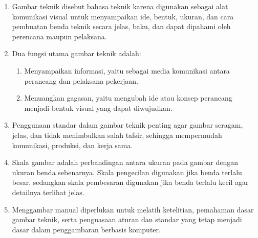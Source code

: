\documentclass[../menggambarteknik.tex]{subfiles}
\begin{document}
\begin{enumerate}

	\item Gambar teknik disebut bahasa teknik karena digunakan sebagai alat komunikasi visual untuk menyampaikan ide, bentuk, ukuran, dan cara pembuatan benda teknik secara jelas, baku, dan dapat dipahami oleh perencana maupun pelaksana.

	\item Dua fungsi utama gambar teknik adalah:
	      \begin{enumerate}
		      \item Menyampaikan informasi, yaitu sebagai media komunikasi antara perancang dan pelaksana pekerjaan.
		      \item Menuangkan gagasan, yaitu mengubah ide atau konsep perancang menjadi bentuk visual yang dapat diwujudkan.
	      \end{enumerate}

	\item Penggunaan standar dalam gambar teknik penting agar gambar seragam, jelas, dan tidak menimbulkan salah tafsir, sehingga mempermudah komunikasi, produksi, dan kerja sama.

	\item Skala gambar adalah perbandingan antara ukuran pada gambar dengan ukuran benda sebenarnya. Skala pengecilan digunakan jika benda terlalu besar, sedangkan skala pembesaran digunakan jika benda terlalu kecil agar detailnya terlihat jelas.

	\item Menggambar manual diperlukan untuk melatih ketelitian, pemahaman dasar gambar teknik, serta penguasaan aturan dan standar yang tetap menjadi dasar dalam penggambaran berbasis komputer.
\end{enumerate}







\end{document}
